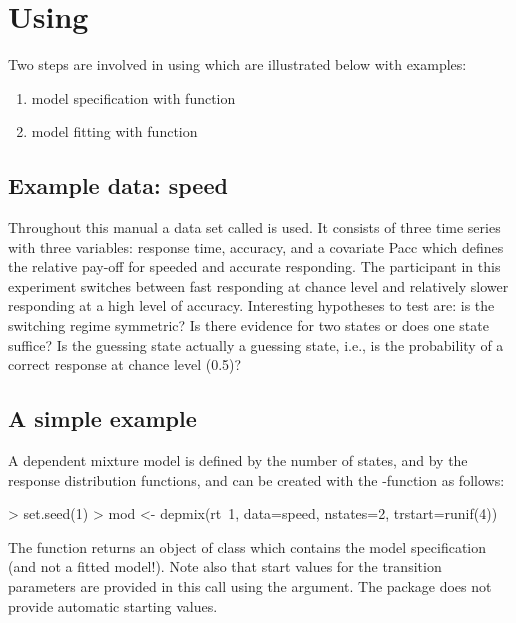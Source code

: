 \documentclass[article]{jss}
\begin{document}


\section[Using depmixS4]{Using }

Two steps are involved in using  which are illustrated
below with examples:
\begin{enumerate}
	\item model specification with function 
	
	\item  model fitting with function 
\end{enumerate}

\subsection{Example data: speed}

Throughout this manual a data set called  is used.  It
consists of three time series with three variables: response time,
accuracy, and a covariate Pacc which defines the relative pay-off for
speeded and accurate responding.  The participant in this experiment
switches between fast responding at chance level and relatively slower
responding at a high level of accuracy.  Interesting hypotheses to
test are: is the switching regime symmetric?  Is there evidence for
two states or does one state suffice?  Is the guessing state actually
a guessing state, i.e., is the probability of a correct response at
chance level (0.5)?

\subsection{A simple example}

A dependent mixture model is defined by the number of states, and by
the response distribution functions, and can be created with the
-function as follows:

\begin{CodeChunk}
\begin{CodeInput}
> set.seed(1)
> mod <- depmix(rt~1, data=speed, nstates=2, trstart=runif(4))
\end{CodeInput}
\end{CodeChunk}

The  function returns an object of class 
which contains the model specification (and not a fitted model!).
Note also that start values for the transition parameters are provided
in this call using the  argument. The package does not 
provide automatic starting values. 
\end{document}

